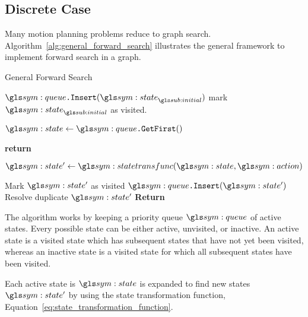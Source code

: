 
	\subsection{Discrete Case}%
	\label{sec:discrete_case}


		Many motion planning problems reduce to graph search.
		Algorithm~\ref{alg:general_forward_search}\cite[adapted
		from][]{bib:planning:planning_algorithms} illustrates the general
		framework to implement forward search in a graph.

		\begin{algorithm}[ht]
			\caption{General Forward Search}\label{alg:general_forward_search}
			\begin{algorithmic}[1]

					\State{} $\queue\code{.Insert}(\state_{\initial})$
					\State{} mark $\state_{\initial}$ as visited.

					\While{$\queue \neq \emptyset$}

						\State{} $\state \gets \queue\code{.GetFirst}()$
						\If{$\state \in \statespace_{\goal}$}

							\State{} \textbf{return} 

						\EndIf{}

						\ForAll{$\action \in \actionspace(\state)$}
							\State{} $\state' \gets \statetransfunc(\state, \action)$

								\State{} Mark $\state'$ as visited
								\State{} $\queue\code{.Insert}(\state')$
							\Else{}
								\State{} Resolve duplicate $\state'$
							\EndIf{}
						\EndFor{}
					\EndWhile{}
					\State{} \textbf{Return} 
				\EndProcedure{}
			\end{algorithmic}
		\end{algorithm}

		The algorithm works by keeping a priority queue $\queue$ of active
		states. Every possible state can be either active, unvisited, or
		inactive. An active state is a visited state which has subsequent states
		that have not yet been visited, whereas an inactive state is a visited
		state for which all subsequent states have been visited.

		Each active state is $\state$ is expanded to find new states $\state'$
		by using the state transformation function,
		Equation~\ref{eq:state_transformation_function}.

